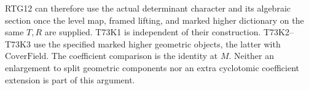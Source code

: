 RTG12 can therefore use the actual determinant character and its
algebraic section once the level map, framed lifting, and marked higher
dictionary on the same $T,R$ are supplied. T73K1 is independent of
their construction. T73K2--T73K3 use the specified marked higher
geometric objects, the latter with $\mathrm{CoverField}$. The
coefficient comparison is the identity at $M$. Neither an enlargement
to split geometric components nor an extra cyclotomic coefficient
extension is part of this argument.
